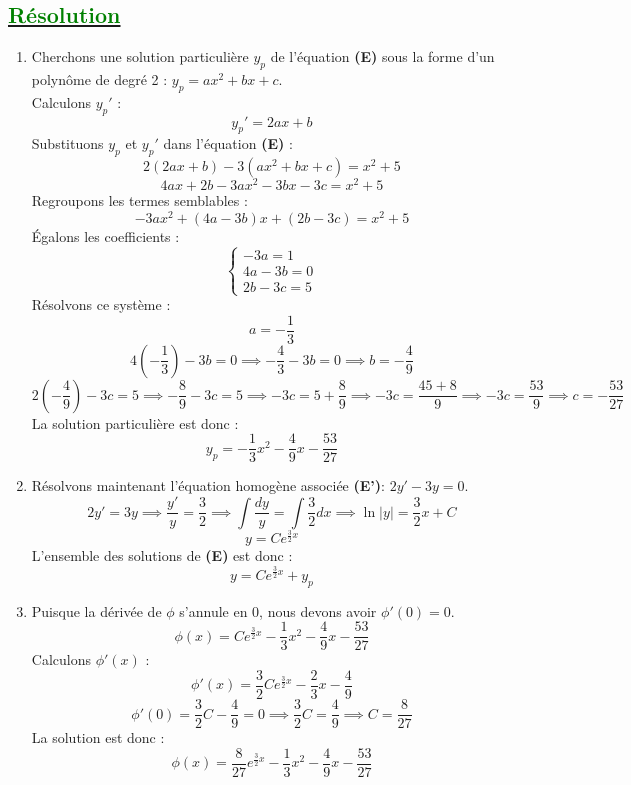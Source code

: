 \documentclass{article}
\begin{document}
\subsection*{\underline{\textbf{\textcolor{green}{Résolution }}}}
\begin{enumerate}
    \item 
    Cherchons une solution particulière $y_p$ de l'équation \textbf{(E)} sous la forme d'un polynôme de degré 2 : $y_p = ax^2 + bx + c$.\\
    Calculons $y_p'$ :
    \[
    y_p' = 2ax + b
    \]
    Substituons $y_p$ et $y_p'$ dans l'équation \textbf{(E)} :
    \[
    2(2ax + b) - 3(ax^2 + bx + c) = x^2 + 5
    \]
    \[
    4ax + 2b - 3ax^2 - 3bx - 3c = x^2 + 5
    \]
    Regroupons les termes semblables :
    \[
    -3ax^2 + (4a - 3b)x + (2b - 3c) = x^2 + 5
    \]
    Égalons les coefficients :
    \[
    \begin{cases}
    -3a = 1 \\
    4a - 3b = 0 \\
    2b - 3c = 5
    \end{cases}
    \]
    Résolvons ce système :
    \[
    a = -\frac{1}{3}
    \]
    \[
    4 \left(-\frac{1}{3}\right) - 3b = 0 \implies -\frac{4}{3} - 3b = 0 \implies b = -\frac{4}{9}
    \]
    \[
    2 \left(-\frac{4}{9}\right) - 3c = 5 \implies -\frac{8}{9} - 3c = 5 \implies -3c = 5 + \frac{8}{9} \implies -3c = \frac{45 + 8}{9} \implies -3c = \frac{53}{9} \implies c = -\frac{53}{27}
    \]
    La solution particulière est donc :
    \[
    y_p = -\frac{1}{3}x^2 - \frac{4}{9}x - \frac{53}{27}
    \]

    \item
    Résolvons maintenant l'équation homogène associée \textbf{(E')}: $2y' - 3y = 0$.
    \[
    2y' = 3y \implies \frac{y'}{y} = \frac{3}{2} \implies \int \frac{dy}{y} = \int \frac{3}{2} dx \implies \ln|y| = \frac{3}{2}x + C
    \]
    \[
    y = Ce^{\frac{3}{2}x}
    \]
    L'ensemble des solutions de \textbf{(E)} est donc :
    \[
    y = Ce^{\frac{3}{2}x} + y_p
    \]

    \item
    Puisque la dérivée de $\phi$ s'annule en 0, nous devons avoir $\phi'(0) = 0$.
    \[
    \phi(x) = Ce^{\frac{3}{2}x} - \frac{1}{3}x^2 - \frac{4}{9}x - \frac{53}{27}
    \]
    Calculons $\phi'(x)$ :
    \[
    \phi'(x) = \frac{3}{2}Ce^{\frac{3}{2}x} - \frac{2}{3}x - \frac{4}{9}
    \]
    \[
    \phi'(0) = \frac{3}{2}C - \frac{4}{9} = 0 \implies \frac{3}{2}C = \frac{4}{9} \implies C = \frac{8}{27}
    \]
    La solution est donc :
    \[
    \phi(x) = \frac{8}{27}e^{\frac{3}{2}x} - \frac{1}{3}x^2 - \frac{4}{9}x - \frac{53}{27}
    \]
    

\end{enumerate}
\end{document}
